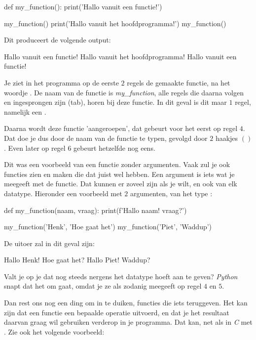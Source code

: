 \begin{python}
def my_function():
    print('Hallo vanuit een functie!') 

my_function()
print('Hallo vanuit het hoofdprogramma!')
my_function()
\end{python}

Dit produceert de volgende output:

\begin{python}
Hallo vanuit een functie!
Hallo vanuit het hoofdprogramma!
Hallo vanuit een functie!
\end{python}

Je ziet in het programma op de eerste $2$ regels de gemaakte functie, na het woordje . De naam van de functie is \textit{my\_function}, alle regels die daarna volgen en ingesprongen zijn (tab), horen bij deze functie. 
In dit geval is dit maar $1$ regel, namelijk een . \newline

Daarna wordt deze functie 'aangeroepen', dat gebeurt voor het eerst op regel $4$. Dat doe je dus door de naam van de functie te typen, gevolgd door $2$ haakjes $( )$. Even later op regel $6$ gebeurt hetzelfde nog eens. \newline

Dit was een voorbeeld van een functie zonder argumenten. Vaak zul je ook functies zien en maken die dat juist wel hebben. Een argument is iets wat je meegeeft met de functie. Dat kunnen er zoveel zijn als je wilt, en ook van elk datatype. Hieronder een voorbeeld met $2$ argumenten, van het type :

\begin{python}
def my_function(naam, vraag):
    print(f'Hallo {naam}! {vraag}?') 

my_function('Henk', 'Hoe gaat het')
my_function('Piet', 'Waddup')
\end{python}
De uitoer zal in dit geval zijn:
\begin{python}
Hallo Henk! Hoe gaat het?
Hallo Piet! Waddup?
\end{python}

Valt je op je dat nog steeds nergens het datatype hoeft aan te geven? \textit{Python} snapt dat het om  gaat, omdat je ze als zodanig meegeeft op regel $4$ en $5$. \newline

\newpage

Dan rest ons nog een ding om in te duiken, functies die iets teruggeven. Het kan zijn dat een functie een bepaalde operatie uitvoerd, en dat je het resultaat daarvan graag wil gebruiken verderop in je programma. Dat kan, net als in \textit{C} met . Zie ook het volgende voorbeeld:

